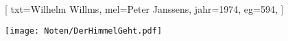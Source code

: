 [
    txt={Wilhelm Willms},
    mel={Peter Janssens},
    jahr={1974},
    eg={594},
]

\texttt{[image: Noten/DerHimmelGeht.pdf]}

\endsong
